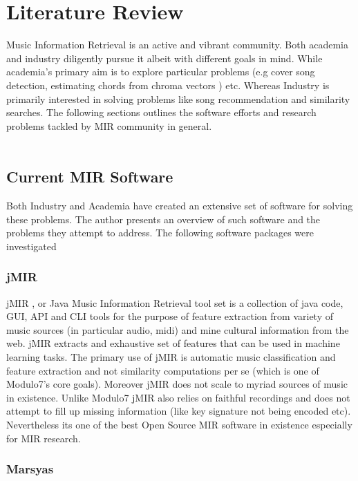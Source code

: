 \chapter{Literature Review}

\noindent Music Information Retrieval is an active and vibrant community. Both academia and industry diligently pursue it albeit with different goals in mind. While academia's primary aim is to explore particular problems (e.g cover song detection, estimating chords from chroma vectors \cite{chord-detection} ) etc. Whereas Industry is primarily interested in solving problems like song recommendation and similarity searches. The following sections outlines the software efforts and research problems tackled by MIR community in general. \\\\

\section{Current MIR Software}
\noindent Both Industry and Academia have created an extensive set of software for solving these problems. The author presents an overview of such software and the problems they attempt to address. The following software packages were investigated 

\subsection{jMIR}

\noindent jMIR  \cite{jMIR}, or Java Music Information Retrieval tool set is a collection of java code, GUI, API and CLI tools for the purpose of feature extraction from variety of music sources (in particular audio, midi) and mine cultural information from the web. jMIR extracts and exhaustive set of features that can be used in machine learning tasks. The primary use of jMIR is automatic music classification and feature extraction and not similarity computations per se (which is one of Modulo7's core goals). Moreover jMIR does not scale to myriad sources of music in existence. Unlike Modulo7 jMIR also relies on faithful recordings and does not attempt to fill up missing information (like key signature not being encoded etc). Nevertheless its one of the best Open Source MIR software in existence especially for MIR research. 

\subsection{Marsyas}

